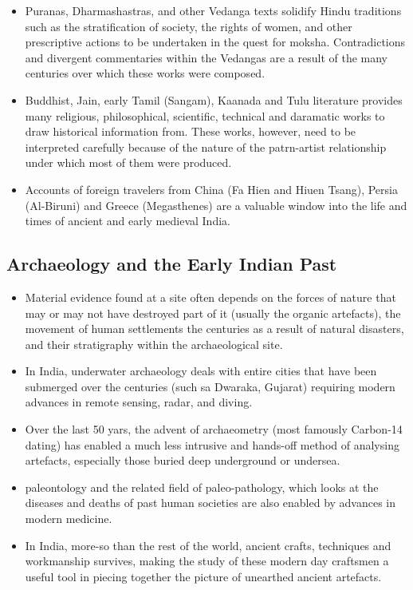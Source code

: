 \begin{itemize}
    \item Puranas, Dharmashastras, and other Vedanga texts solidify Hindu traditions such as the stratification of society, the rights of women, and other prescriptive actions to be undertaken in the quest for \Gls{moksha}. Contradictions and divergent commentaries within the Vedangas are a result of the many centuries over which these works were composed.
    \item Buddhist, Jain, early Tamil (Sangam), Kaanada and Tulu literature provides many religious, philosophical, scientific, technical and daramatic works to draw historical information from. These works, however, need to be interpreted carefully because of the nature of the patrn-artist relationship under which most of them were produced.
    \item Accounts of foreign travelers from China (Fa Hien and Hiuen Tsang), Persia (Al-Biruni) and Greece (Megasthenes) are a valuable window into the life and times of ancient and early medieval India.
\end{itemize}

\subsection{Archaeology and the Early Indian Past}
\begin{itemize}
    \item Material evidence found at a site often depends on the forces of nature that may or may not have destroyed part of it (usually the organic artefacts), the movement of human settlements the centuries as a result of natural disasters, and their \gls{stratigraphy} within the archaeological site.
    \item In India, underwater archaeology deals with entire cities that have been submerged over the centuries (such sa Dwaraka, Gujarat) requiring modern advances in remote sensing, radar, and diving.
    \item Over the last 50 yars, the advent of \gls{archaeometry} (most famously Carbon-14 dating) has enabled a much less intrusive and hands-off method of analysing artefacts, especially those buried deep underground or undersea.
    \item \Gls{paleontology} and the related field of paleo-pathology, which looks at the diseases and deaths of past human societies are also enabled by advances in modern medicine.
    \item In India, more-so than the rest of the world, ancient crafts, techniques and workmanship survives, making the study of these modern day craftsmen a useful tool in piecing together the picture of unearthed ancient artefacts.
\end{itemize}

